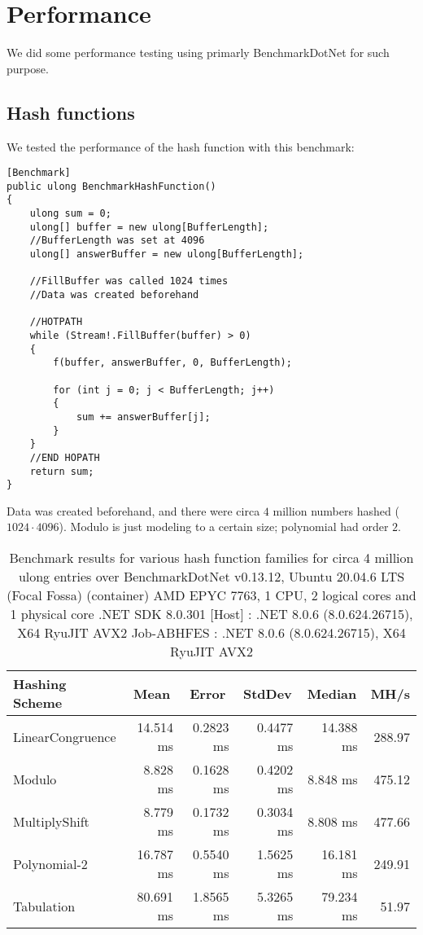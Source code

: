 \FloatBarrier

\section{Performance}
We did some performance testing using primarly BenchmarkDotNet for such purpose. 

\subsection{Hash functions}
We tested the performance of the hash function with this benchmark:
\begin{lstlisting}
[Benchmark]
public ulong BenchmarkHashFunction()
{
    ulong sum = 0;
    ulong[] buffer = new ulong[BufferLength];
    //BufferLength was set at 4096
    ulong[] answerBuffer = new ulong[BufferLength];

    //FillBuffer was called 1024 times
    //Data was created beforehand

    //HOTPATH
    while (Stream!.FillBuffer(buffer) > 0)
    {
        f(buffer, answerBuffer, 0, BufferLength);

        for (int j = 0; j < BufferLength; j++)
        {
            sum += answerBuffer[j];
        }
    }
    //END HOPATH
    return sum;
}
\end{lstlisting}
Data was created beforehand, and there were circa $4$ million numbers hashed ($1024 \cdot 4096$). Modulo is just modeling to a certain size; polynomial had order $2$.
\begin{table}[h!]
\centering
\begin{tabular}{l r r r r r}
\toprule
Hashing Scheme & \multicolumn{1}{c}{Mean} & \multicolumn{1}{c}{Error} & \multicolumn{1}{c}{StdDev} & \multicolumn{1}{c}{Median} & \multicolumn{1}{c}{MH/s} \\
\midrule
LinearCongruence    & 14.514 ms & 0.2823 ms & 0.4477 ms & 14.388 ms & 288.97 \\
Modulo          &  8.828 ms & 0.1628 ms & 0.4202 ms &  8.848 ms & 475.12 \\
MultiplyShift    &  8.779 ms & 0.1732 ms & 0.3034 ms &  8.808 ms & 477.66 \\
Polynomial-2           & 16.787 ms & 0.5540 ms & 1.5625 ms & 16.181 ms & 249.91 \\
Tabulation           & 80.691 ms & 1.8565 ms & 5.3265 ms & 79.234 ms &  51.97 \\
\bottomrule
\end{tabular}
\caption{Benchmark results for various hash function families for circa 4 million ulong entries over BenchmarkDotNet v0.13.12, Ubuntu 20.04.6 LTS (Focal Fossa) (container)
AMD EPYC 7763, 1 CPU, 2 logical cores and 1 physical core
.NET SDK 8.0.301
  [Host]     : .NET 8.0.6 (8.0.624.26715), X64 RyuJIT AVX2
  Job-ABHFES : .NET 8.0.6 (8.0.624.26715), X64 RyuJIT AVX2 }
\label{table:benchmark_results_hash_functions}
\end{table}

